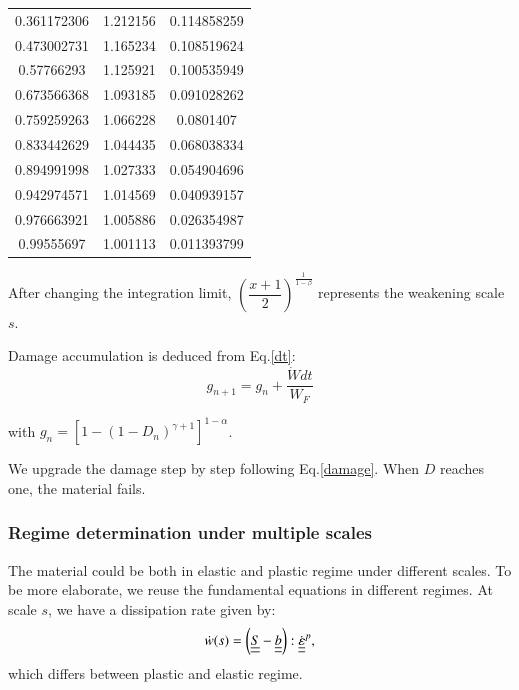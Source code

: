 \documentclass[3p,times,procedia,number]{elsarticle}
\begin{document}
\begin{table}[!h]
\begin{tabular}{ccc}
		0.361172306                      & 1.212156                 & 0.114858259                                   \\
		0.473002731                      & 1.165234                 & 0.108519624                                   \\
		0.57766293                       & 1.125921                 & 0.100535949                                   \\
		0.673566368                      & 1.093185                 & 0.091028262                                   \\
		0.759259263                      & 1.066228                 & 0.0801407                                     \\
		0.833442629                      & 1.044435                 & 0.068038334                                   \\
		0.894991998                      & 1.027333                 & 0.054904696                                   \\
		0.942974571                      & 1.014569                 & 0.040939157                                   \\
		0.976663921                      & 1.005886                 & 0.026354987                                   \\
		0.99555697                       & 1.001113                 & 0.011393799                                   \\ \hline
	\end{tabular}
\end{table}

After changing the integration limit, $\left( \dfrac{x+1}{2}\right) ^{\frac{1}{1-\beta}}$ represents the weakening scale $s$. 

Damage accumulation is deduced from Eq.\eqref{dt}:
\begin{equation}
	g_{n+1}=g_n+\dfrac{\dot{W}dt}{W_F}
	\label{damage}
\end{equation}

with $g_n=\left[ 1-\left( 1-D_{n}\right)^{\gamma+1} \right]^{1-\alpha}$.

We upgrade the damage step by step following Eq.\eqref{damage}. When $D$ reaches one, the material fails. 

\subsubsection{Regime determination under multiple scales}
The material could be both in elastic and plastic regime under different scales. To be more elaborate, we reuse the fundamental equations in different regimes. At scale $s$, we have a dissipation rate given by:
$$\dot{w}(s)=\left( \uline{\uline{S}}-\uline{\uline{b}}\right):\dot{\uline{\uline{\varepsilon}}}^p, $$
which differs between plastic and elastic regime.
\end{document}
